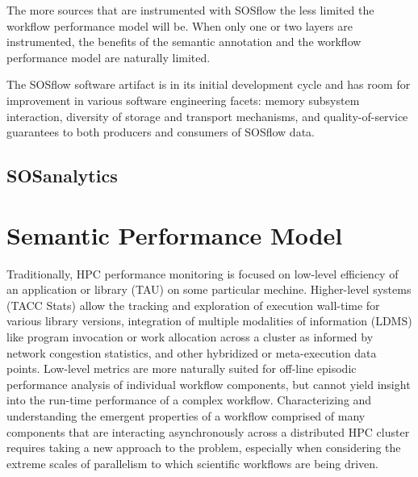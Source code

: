 The more sources that are instrumented with SOSflow the less limited
the workflow performance model will be. When only one or two layers
are instrumented, the benefits of the semantic annotation and the
workflow performance model are naturally limited.

The SOSflow software artifact is in its initial development cycle and
has room for improvement in various software engineering facets:
memory subsystem interaction, diversity of storage and transport
mechanisms, and quality-of-service guarantees to both producers and
consumers of SOSflow data.


\subsection{SOSanalytics}





\section{Semantic Performance Model}
Traditionally, HPC performance monitoring is focused on low-level
efficiency of an application or library (TAU) on some particular mechine.
Higher-level systems (TACC Stats) allow the tracking and exploration
of execution wall-time for various library versions, integration of
multiple modalities of information (LDMS) like program invocation or
work allocation across a cluster as informed by network congestion
statistics, and other hybridized or meta-execution data points.
Low-level metrics are more naturally suited for off-line episodic
performance analysis of individual workflow components, but cannot
yield insight into the run-time performance of a complex workflow.
Characterizing and understanding the emergent properties of a workflow
comprised of many components that are interacting asynchronously
across a distributed HPC cluster requires taking a new approach to the
problem, especially when considering the extreme scales of parallelism
to which scientific workflows are being driven.


